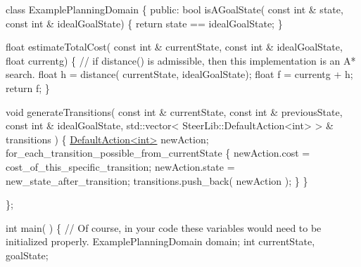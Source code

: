 \begin{DoxyCode}
           \textcolor{keyword}{class }ExamplePlanningDomain \{
             \textcolor{keyword}{public}:
               \textcolor{keywordtype}{bool} isAGoalState( \textcolor{keyword}{const} \textcolor{keywordtype}{int} & state,
                                  \textcolor{keyword}{const} \textcolor{keywordtype}{int} & idealGoalState)
               \{
                   \textcolor{keywordflow}{return} state == idealGoalState;
               \}
          
               \textcolor{keywordtype}{float} estimateTotalCost( \textcolor{keyword}{const} \textcolor{keywordtype}{int} & currentState, 
                                        \textcolor{keyword}{const} \textcolor{keywordtype}{int} & idealGoalState,
                                        \textcolor{keywordtype}{float} currentg)
               \{
                   \textcolor{comment}{// if distance() is admissible, then this implementation is
       an A* search.}
                   \textcolor{keywordtype}{float} h = distance( currentState, idealGoalState);
                   \textcolor{keywordtype}{float} f = currentg + h;  
                   \textcolor{keywordflow}{return} f;
               \}
          
               \textcolor{keywordtype}{void} generateTransitions( \textcolor{keyword}{const} \textcolor{keywordtype}{int} & currentState,
                                         \textcolor{keyword}{const} \textcolor{keywordtype}{int} & previousState, 
                                         \textcolor{keyword}{const} \textcolor{keywordtype}{int} & idealGoalState,
                                         std::vector<
      SteerLib::DefaultAction<int> > & transitions )
               \{
                   \hyperlink{class_default_action}{DefaultAction<int>} newAction;
                   for\_each\_transition\_possible\_from\_currentState \{
                       newAction.cost = cost\_of\_this\_specific\_transition;
                       newAction.state = new\_state\_after\_transition;
                       transitions.push\_back( newAction );
                   \}
               \}
          
           \};
          
           \textcolor{keywordtype}{int} main( )
           \{
               \textcolor{comment}{// Of course, in your code these variables would need to be
       initialized properly.}
               ExamplePlanningDomain domain;
               \textcolor{keywordtype}{int} currentState, goalState;
          

\end{DoxyCode}
